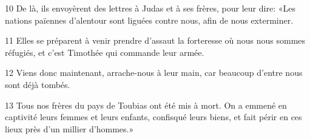 
10 De là, ils envoyèrent des lettres à Judas et à ses frères, pour leur dire: «Les nations païennes d’alentour sont liguées contre nous, afin de nous exterminer.

11 Elles se préparent à venir prendre d’assaut la forteresse où nous nous sommes réfugiés, et c’est Timothée qui commande leur armée.

12 Viens donc maintenant, arrache-nous à leur main, car beaucoup d’entre nous sont déjà tombés.

13 Tous nos frères du pays de Toubias ont été mis à mort. On a emmené en captivité leurs femmes et leurs enfants, confisqué leurs biens, et fait périr en ces lieux près d’un millier d’hommes.»